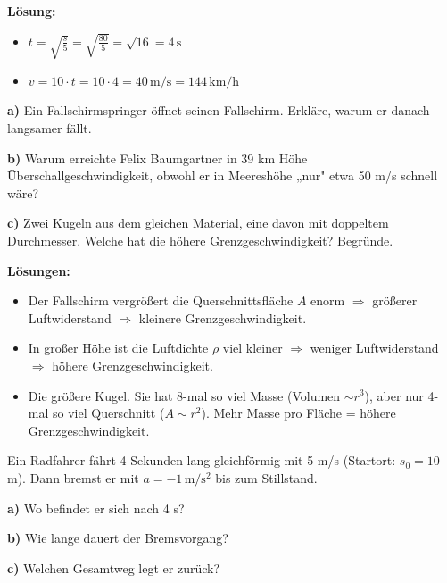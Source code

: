 \documentclass[11pt,a4paper]{article}
\begin{document}
\textbf{Lösung:}
\begin{itemize}
\item[a)] $t = \sqrt{\frac{s}{5}} = \sqrt{\frac{80}{5}} = \sqrt{16} = 4\,\mathrm{s}$
\item[b)] $v = 10 \cdot t = 10 \cdot 4 = 40\,\mathrm{m/s} = 144\,\mathrm{km/h}$
\end{itemize}

\vspace{0.5cm}

\begin{aufgabe}
\textbf{a)} Ein Fallschirmspringer öffnet seinen Fallschirm. Erkläre, warum er danach langsamer fällt.

\textbf{b)} Warum erreichte Felix Baumgartner in 39 km Höhe Überschallgeschwindigkeit, obwohl er in Meereshöhe „nur" etwa 50 m/s schnell wäre?

\textbf{c)} Zwei Kugeln aus dem gleichen Material, eine davon mit doppeltem Durchmesser. Welche hat die höhere Grenzgeschwindigkeit? Begründe.
\end{aufgabe}

\textbf{Lösungen:}
\begin{itemize}
\item[a)] Der Fallschirm vergrößert die Querschnittsfläche $A$ enorm $\Rightarrow$ größerer Luftwiderstand $\Rightarrow$ kleinere Grenzgeschwindigkeit.
\item[b)] In großer Höhe ist die Luftdichte $\rho$ viel kleiner $\Rightarrow$ weniger Luftwiderstand $\Rightarrow$ höhere Grenzgeschwindigkeit.
\item[c)] Die größere Kugel. Sie hat 8-mal so viel Masse (Volumen $\sim r^3$), aber nur 4-mal so viel Querschnitt ($A \sim r^2$). Mehr Masse pro Fläche = höhere Grenzgeschwindigkeit.
\end{itemize}

\vspace{0.5cm}

\begin{aufgabe}
Ein Radfahrer fährt 4 Sekunden lang gleichförmig mit 5 m/s (Startort: $s_0 = 10$ m). Dann bremst er mit $a = -1\,\mathrm{m/s^2}$ bis zum Stillstand.

\textbf{a)} Wo befindet er sich nach 4 s?

\textbf{b)} Wie lange dauert der Bremsvorgang?

\textbf{c)} Welchen Gesamtweg legt er zurück?
\end{aufgabe}
\end{document}
